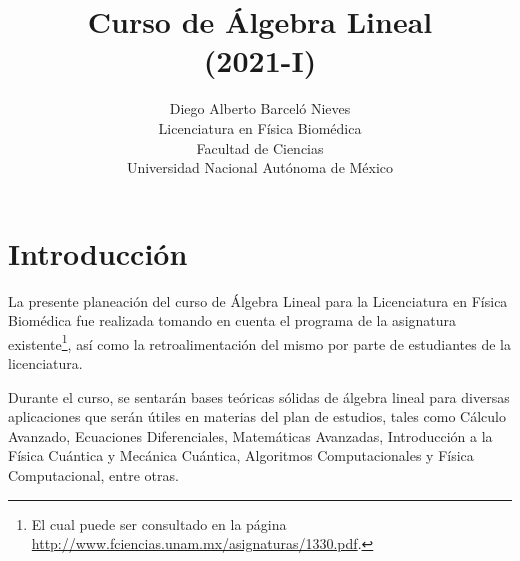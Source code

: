 \documentclass[12pt,dvipsnames]{article}
\begin{document}
\title{Curso de Álgebra Lineal \\ (2021-I)}
\author{Diego Alberto Barceló Nieves\\ Licenciatura en Física Biomédica \\ Facultad de Ciencias \\ Universidad Nacional Autónoma de México}
\date{}
\maketitle

\iffalse
\section{Introducción}

La presente planeación del curso de Álgebra Lineal para la Licenciatura en Física Biomédica fue realizada tomando en cuenta el programa de la asignatura existente\footnote{El cual puede ser consultado en la página \url{http://www.fciencias.unam.mx/asignaturas/1330.pdf}.}, así como la retroalimentación del mismo por parte de estudiantes de la licenciatura.


Durante el curso, se sentarán bases teóricas sólidas de álgebra lineal para diversas aplicaciones que serán útiles en materias del plan de estudios, tales como Cálculo Avanzado, Ecuaciones Diferenciales, Matemáticas Avanzadas, Introducción a la Física Cuántica y Mecánica Cuántica, Algoritmos Computacionales y Física Computacional, entre otras.
\end{document}
